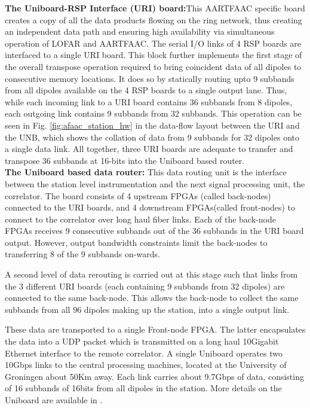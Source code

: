 \documentclass{ws-jai}
\begin{document}
\noindent  \textbf  {The  Uniboard-RSP   Interface  (URI)  board:}This  AARTFAAC
specific board  creates a  copy of  all the  data products  flowing on  the ring
network, thus creating  an independent data path and  ensuring high availability
via simultaneous operation of LOFAR and AARTFAAC.  The serial I/O links of 4 RSP
boards are interfaced to a single  URI board.  This block further implements the
first stage of the overall transpose operation required to bring coincident data
of  all dipoles  to  consecutive memory  locations.  It  does  so by  statically
routing upto  9 subbands from  all dipoles  available on the  4 RSP boards  to a
single output lane.  Thus, while each incoming  link to a URI  board contains 36
subbands  from  8 dipoles,  each  outgoing  link  contains  9 subbands  from  32
subbands.  This operation can be seen in Fig.  \ref{fig:afaac_station_hw} in the
data-flow layout between the URI and the  UNB, which shows the collation of data
from 9 subbands for 32 dipoles onto a single data link.  All together, three URI
boards are  adequate to transfer and  transpose 36 subbands at  16-bits into the
Uniboard based router.\\

\noindent \textbf  {The Uniboard based data  router:} This data routing  unit is
the  interface between  the station  level instrumentation  and the  next signal
processing unit, the correlator. The board  consists of 4 upstream FPGAs (called
back-nodes)  connected  to   the  URI  boards,  and   4  downstream  FPGAs(called
front-nodes) to  connect to the correlator  over long haul fiber  links.  Each of
the back-node FPGAs receives 9 consecutive subbands out of the 36 subbands in the
URI board output.  However, output bandwidth constraints limit  the back-nodes to
transferring 8 of the 9 subbands on-wards.

A second level  of data rerouting is  carried out at this stage  such that links
from the 3 different URI boards (each containing 9 subbands from 32 dipoles) are
connected to  the same back-node.  This allows the  back-node to collect  the same
subbands from all 96  dipoles making up the station, into  a single output link.

These data are transported to a  single Front-node FPGA.  The latter encapsulates
the  data into  a UDP  packet  which is  transmitted  on a  long haul  10Gigabit
Ethernet interface  to the  remote correlator.  A  single Uniboard  operates two
10Gbps links  to the central processing  machines, located at the  University of
Groningen about 50Km away.  Each link  carries about 9.7Gbps of data, consisting
of 16 subbands of 16bits from all dipoles in the station. More details on the Uniboard are available in \citep{gunst2014application}.\\
\end{document}
